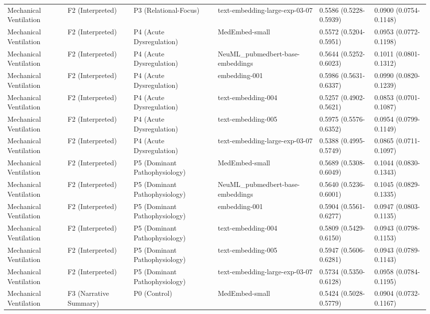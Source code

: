 \documentclass[border=0pt]{standalone}
\begin{document}
\begin{adjustbox}{width=\textwidth}
\begin{tabular}{llllll}
Mechanical Ventilation & F2 (Interpreted) & P3 (Relational-Focus) & text-embedding-large-exp-03-07 & 0.5586 (0.5228-0.5939) & 0.0900 (0.0754-0.1148) \\
Mechanical Ventilation & F2 (Interpreted) & P4 (Acute Dysregulation) & MedEmbed-small & 0.5572 (0.5204-0.5951) & 0.0953 (0.0772-0.1198) \\
Mechanical Ventilation & F2 (Interpreted) & P4 (Acute Dysregulation) & NeuML\_pubmedbert-base-embeddings & 0.5644 (0.5252-0.6023) & 0.1011 (0.0801-0.1312) \\
Mechanical Ventilation & F2 (Interpreted) & P4 (Acute Dysregulation) & embedding-001 & 0.5986 (0.5631-0.6337) & 0.0990 (0.0820-0.1239) \\
Mechanical Ventilation & F2 (Interpreted) & P4 (Acute Dysregulation) & text-embedding-004 & 0.5257 (0.4902-0.5621) & 0.0853 (0.0701-0.1087) \\
Mechanical Ventilation & F2 (Interpreted) & P4 (Acute Dysregulation) & text-embedding-005 & 0.5975 (0.5576-0.6352) & 0.0954 (0.0799-0.1149) \\
Mechanical Ventilation & F2 (Interpreted) & P4 (Acute Dysregulation) & text-embedding-large-exp-03-07 & 0.5388 (0.4995-0.5749) & 0.0865 (0.0711-0.1097) \\
Mechanical Ventilation & F2 (Interpreted) & P5 (Dominant Pathophysiology) & MedEmbed-small & 0.5689 (0.5308-0.6049) & 0.1044 (0.0830-0.1343) \\
Mechanical Ventilation & F2 (Interpreted) & P5 (Dominant Pathophysiology) & NeuML\_pubmedbert-base-embeddings & 0.5640 (0.5236-0.6001) & 0.1045 (0.0829-0.1335) \\
Mechanical Ventilation & F2 (Interpreted) & P5 (Dominant Pathophysiology) & embedding-001 & 0.5904 (0.5561-0.6277) & 0.0947 (0.0803-0.1135) \\
Mechanical Ventilation & F2 (Interpreted) & P5 (Dominant Pathophysiology) & text-embedding-004 & 0.5809 (0.5429-0.6150) & 0.0943 (0.0798-0.1153) \\
Mechanical Ventilation & F2 (Interpreted) & P5 (Dominant Pathophysiology) & text-embedding-005 & 0.5947 (0.5606-0.6281) & 0.0943 (0.0789-0.1143) \\
Mechanical Ventilation & F2 (Interpreted) & P5 (Dominant Pathophysiology) & text-embedding-large-exp-03-07 & 0.5734 (0.5350-0.6128) & 0.0958 (0.0784-0.1195) \\
Mechanical Ventilation & F3 (Narrative Summary) & P0 (Control) & MedEmbed-small & 0.5424 (0.5028-0.5779) & 0.0904 (0.0732-0.1167) \\

\end{tabular}
\end{adjustbox}
\end{document}
